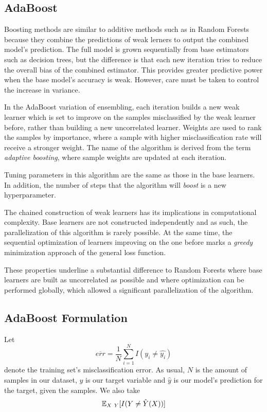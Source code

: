 \subsection{AdaBoost}
\textcite{schapire-adaBoost}

Boosting methods are similar to additive methods such as in Random Forests because they combine the predictions of weak lerners to output the combined model's prediction. The full model is grown sequentially from base estimators such as decision trees, but the difference is that each new iteration tries to reduce the overall bias of the combined estimator. This provides greater predictive power when the base model's accuracy is weak. However, care must be taken to control the increase in variance.

In the AdaBoost variation of ensembling, each iteration builds a new weak learner which is set to improve on the samples misclassified by the weak learner before, rather than building a new uncorrelated learner. Weights are used to rank the samples by importance, where a sample with higher misclassification rate will receive a stronger weight. The name of the algorithm is derived from the term \textit{adaptive boosting}, where sample weights are updated at each iteration.

Tuning parameters in this algorithm are the same as those in the base learners. In addition, the number of steps that the algorithm will \textit{boost} is a new hyperparameter.

The chained construction of weak learners has its implications in computational complexity. Base learners are not constructed independently and as such, the parallelization of this algorithm is rarely possible. At the same time, the sequential optimization of learners improving on the one before marks a \textit{greedy} minimization approach of the general loss function.

These properties underline a substantial difference to Random Forests where base learners are built as uncorrelated as possible and where optimization can be performed globally, which allowed a significant parallelization of the algorithm.

\subsection{AdaBoost Formulation}

Let
\begin{equation} \label{equation-adaBoostTrainingError}
\overline{err} = \frac{1}{N} \sum_{i=1}^{N} I(y_i \neq \hat{y_i})
\end{equation}
denote the training set's misclassification error. As usual, $N$ is the amount of samples in our dataset, $y$ is our target variable and $\hat{y}$ is our model's prediction for the target, given the samples. We also take
$$\operatorname{\mathbb{E}}_{X \ Y} [ I(Y \neq \hat{Y}(X)) ]$$

